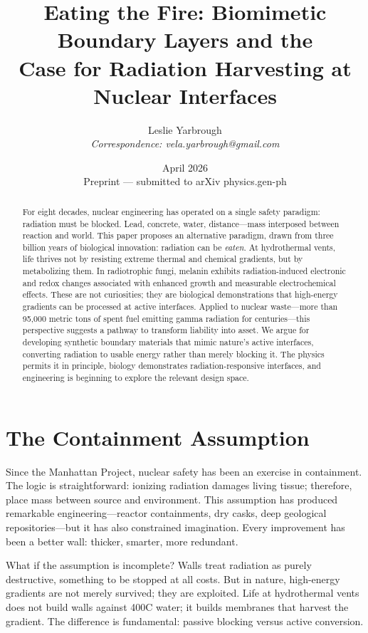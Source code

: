\documentclass[12pt]{article}
\title{\textbf{Eating the Fire: Biomimetic Boundary Layers and the\\
Case for Radiation Harvesting at Nuclear Interfaces}}
\author{Leslie Yarbrough\\
\small\textit{Correspondence: vela.yarbrough@gmail.com}}
\date{April 2026\\[0.5em]
\small Preprint — submitted to arXiv physics.gen-ph}
\begin{document}
\maketitle

\begin{abstract}
For eight decades, nuclear engineering has operated on a single safety paradigm:
radiation must be blocked. Lead, concrete, water, distance---mass interposed between
reaction and world. This paper proposes an alternative paradigm, drawn from three billion
years of biological innovation: radiation can be \emph{eaten}. At hydrothermal vents,
life thrives not by resisting extreme thermal and chemical gradients, but by metabolizing
them. In radiotrophic fungi, melanin exhibits radiation-induced electronic and redox
changes associated with enhanced growth and measurable electrochemical effects. These are
not curiosities; they are biological demonstrations that high-energy gradients can be
processed at active interfaces. Applied to nuclear waste---more than 95{,}000 metric tons
of spent fuel emitting gamma radiation for centuries---this perspective suggests a pathway
to transform liability into asset. We argue for developing synthetic boundary materials
that mimic nature's active interfaces, converting radiation to usable energy rather than
merely blocking it. The physics permits it in principle, biology demonstrates
radiation-responsive interfaces, and engineering is beginning to explore the relevant
design space.
\end{abstract}

\tableofcontents
\newpage

\section{The Containment Assumption}

Since the Manhattan Project, nuclear safety has been an exercise in containment. The
logic is straightforward: ionizing radiation damages living tissue; therefore, place mass
between source and environment. This assumption has produced remarkable
engineering---reactor containments, dry casks, deep geological repositories---but it has
also constrained imagination. Every improvement has been a better wall: thicker, smarter,
more redundant.

What if the assumption is incomplete? Walls treat radiation as purely destructive,
something to be stopped at all costs. But in nature, high-energy gradients are not merely
survived; they are exploited. Life at hydrothermal vents does not build walls against
400\textdegree C water; it builds membranes that harvest the gradient. The difference is
fundamental: passive blocking versus active conversion.
\end{document}

